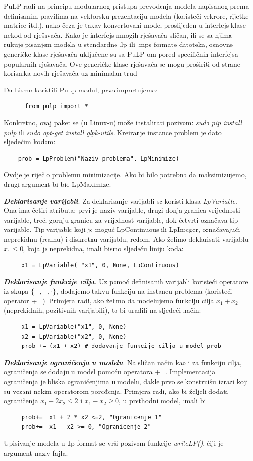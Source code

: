\documentclass[a4paper, utf8, 11pt, colorlinks]{article}
\begin{document}
 PuLP radi na principu modularnog pristupa prevođenja modela napisanog prema definisanim pravilima na vektorsku prezentaciju modela (koristeči vekrore, rijetke matrice itd.), nako čega je takav konvertovani model proslijeđen u interfejs klase nekod od rješavača. Kako je interfejs mnogih rješavača sličan, ili se sa njima rukuje pisanjem modela u standardne .lp ili .mps  formate datoteka, osnovne generičke klase rješavača uključene su sa PuLP-om pored specifičnih interfejsa popularnih rješavača. Ove generičke klase rješavača se mogu proširiti od strane korisnika novih rješavača uz minimalan trud.   
 
 Da bismo koristili PuLp modul, prvo importujemo:
 \begin{verbatim}
 	  from pulp import *
 \end{verbatim}
 Konkretno, ovaj paket se (u Linux-u) može instalirati pozivom: \emph{sudo pip install pulp} ili \emph{sudo apt-get install glpk-utils}. 
 Kreiranje instance problem je dato sljedećim kodom:
 \begin{verbatim}
 	prob = LpProblem("Naziv problema", LpMinimize)
 \end{verbatim}
Ovdje je   riječ o problemu minimizacije. Ako bi bilo potrebno da maksimizujemo, drugi argument bi bio 
LpMaximize. 

\textbf{\emph{Deklarisanje varijabli}}.  Za deklarisanje varijabli se koristi klasa \emph{LpVariable}. Ona ima četiri atributa: prvi je naziv varijable, drugi donja granica vrijednosti varijable, treći gornju granicu za vrijednost varijable, dok četvrti označava tip varijable. Tip varijable koji je moguć LpContinuous ili LpInteger, označavajući neprekidnu (realnu) i diskretnu varijablu, redom.  
Ako želimo deklarisati varijablu $x_1\leq 0$, koja je neprekidna, imali bismo sljedeću liniju koda:
\begin{verbatim}
	 x1 = LpVariable( "x1", 0, None, LpContinuous)
\end{verbatim}
\textbf{\emph{Deklarisanje funkcije cilja}}. Uz pomoć definisanih varijabli koristeći operatore iz skupa $\{+,-, \cdot \}$, dodajemo takvu funkciju na instancu problema (koristeći operator +=). Primjera radi, ako želimo da modelujemo funkciju cilja $x_1 + x_2$ (neprekidnih, pozitivnih varijabili), to bi uradili na sljedeći način:
\begin{verbatim}
	 x1 = LpVariable("x1", 0, None)
	 x2 = LpVariable("x2", 0, None) 
	 prob += (x1 + x2) # dodavanje funkcije cilja u model prob
\end{verbatim}  
\textbf{\emph{Deklarisanje ograničenja u modelu}}.  Na sličan način kao i za funkciju cilja, ograničenja se dodaju u model pomoću operatora +=. Implementacija ograničenja je bliska ograničenjima u modelu, dakle prvo se konstruišu izrazi koji su vezani nekim operatorom poređenja. Primjera radi, ako bi željeli dodati ograničenja $x_1 + 2 x_2 \leq 2$ i $x_1-x_2 \geq 0$,  u prethodni model, imali bi 
\begin{verbatim}
	 prob+=  x1 + 2 * x2 <=2, "Ogranicenje 1"
	 prob+=  x1 - x2 >= 0, "Ogranicenje 2" 
\end{verbatim}
Upisivanje modela u .lp format se vrši pozivom funkcije \emph{writeLP()}, čiji je argument naziv fajla. 
\end{document}
